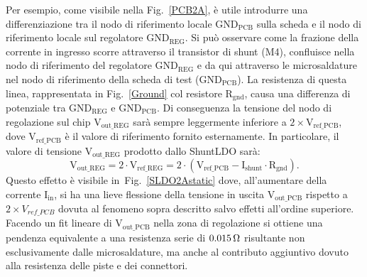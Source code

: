 Per esempio, come visibile nella Fig.~\ref{PCB2A}, \`e utile introdurre una differenziazione tra il nodo di riferimento locale $\mathrm{GND_{PCB}}$ sulla scheda e il nodo di riferimento locale sul regolatore $\mathrm{GND_{REG}}$. Si pu\`o osservare come la frazione della corrente in ingresso scorre attraverso il transistor di shunt (M4), confluisce nella nodo di riferimento del regolatore $\mathrm{GND_{REG}}$ e da qui attraverso le microsaldature nel nodo di riferimento della scheda di test ($\mathrm{GND_{PCB}}$). 
La resistenza di questa linea, rappresentata in Fig.~\ref{Ground} col resistore $\mathrm{R_{gnd}}$, causa una differenza di potenziale tra $\mathrm{GND_{REG}}$ e $\mathrm{GND_{PCB}}$. Di conseguenza la tensione del nodo di regolazione sul chip $\mathrm{V_{out{\_}REG}}$ sar\`a sempre leggermente inferiore a $\mathrm{2\times V_{ref {\_} PCB}}$, dove $\mathrm{V_{ref {\_} PCB}}$ \`e il valore di riferimento fornito esternamente. In particolare, il valore di tensione $\mathrm{V_{out{\_}REG}}$ prodotto dallo ShuntLDO sarà:
\begin{equation}
  \mathrm{V_{out{\_}REG} = 2 \cdot V_{ref{\_}REG} = 2 \cdot ( V_{ref {\_} PCB} - I_{shunt} \cdot R_{gnd} )}.
\end{equation}
Questo effetto è visibile in~Fig.~\ref{SLDO2Astatic} dove, all'aumentare della corrente $\mathrm{I_{in}}$, si ha una lieve flessione della tensione in uscita $\mathrm{V_{out{\_}PCB}}$ rispetto a $2 \times V_{ref{\_}PCB}$ dovuta al fenomeno sopra descritto salvo effetti all'ordine superiore. Facendo un fit lineare di $\mathrm{V_{out{\_}PCB}}$ nella zona di regolazione si ottiene una pendenza equivalente a una resistenza serie di $0.015{\rm \, \Omega}$ risultante non esclusivamente dalle microsaldature, ma anche al contributo aggiuntivo dovuto alla resistenza delle piste e dei connettori.


